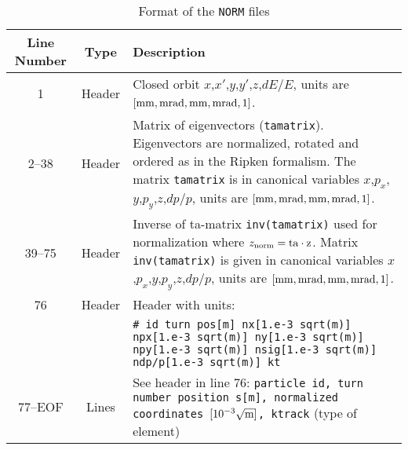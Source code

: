 \begin{table}[H]
\begin{center}
    \caption{Format of the \texttt{NORM} files}\label{fma:tab:2}
    \begin{tabularx}{\textwidth}{|c|c|X|}
        \hline
        \rowcolor{blue!30}
        \textbf{Line Number} & \textbf{Type} & \textbf{Description} \\
        \hline
        1 & Header & Closed orbit  $x$,$x'$,$y$,$y'$,$z$,$dE/E$, units are $[\rm mm,mrad,mm,mrad,1]$. \\
        \hline
        2--38 & Header & Matrix of eigenvectors (\texttt{tamatrix}). Eigenvectors are normalized, rotated and ordered as in the Ripken formalism. The matrix \texttt{tamatrix} is in canonical variables $x$,$p_x$,$y$,$p_y$,$z$,$dp/p$, units are $[\rm mm,mrad,mm,mrad,1]$. \\
        \hline
        39--75 & Header & Inverse of ta-matrix \texttt{inv(tamatrix)} used for normalization where \hbox{$z_{\rm norm}=\rm{ta}\cdot z$}. Matrix \texttt{inv(tamatrix)} is given in canonical variables $x$,$p_x$,$y$,$p_y$,$z$,$dp/p$, units are $[\rm mm,mrad,mm,mrad,1]$.\\
        \hline
        76 & Header & Header with units:\\
        &  & \texttt{\# id turn pos[m] nx[1.e-3 sqrt(m)] npx[1.e-3 sqrt(m)] ny[1.e-3 sqrt(m)] npy[1.e-3 sqrt(m)] nsig[1.e-3 sqrt(m)] ndp/p[1.e-3 sqrt(m)] kt} \\
        \hline
        77--EOF & Lines & See header in line 76: \texttt{particle id, turn number position s[m], normalized coordinates $[10^{-3} \sqrt{\rm m}]$, ktrack} (type of element)\\
        \hline
    \end{tabularx}
\end{center}
\end{table}

